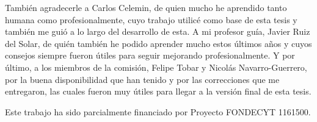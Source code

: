 \documentclass[upright, contnum]{umemoria}
\begin{document}
\begin{thanks}
También agradecerle a Carlos Celemin, de quien mucho he aprendido tanto humana como profesionalmente, cuyo trabajo utilicé como base de esta tesis y también me guió a lo largo del desarrollo de esta. A mi profesor guía, Javier Ruiz del Solar, de quién también he podido aprender mucho estos últimos años y cuyos consejos siempre fueron útiles para seguir mejorando profesionalmente. Y por último, a los miembros de la comisión, Felipe Tobar y Nicolás Navarro-Guerrero, por la buena disponibilidad que han tenido y por las correcciones que me entregaron, las cuales fueron muy útiles para llegar a la versión final de esta tesis.

Este trabajo ha sido parcialmente financiado por Proyecto FONDECYT 1161500.
\end{thanks}

\cleardoublepage
\tableofcontents
\cleardoublepage
\listoftables
\cleardoublepage
\listoffigures

\mainmatter








\newpage
{}




\end{document}
